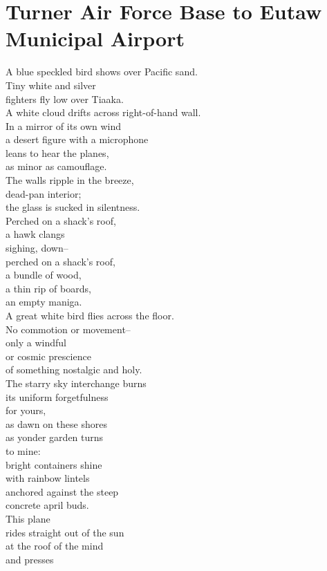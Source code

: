 \documentclass[smalldemyvopaper,11pt,twoside,onecolumn,openright,extrafontsizes]{memoir}
\begin{document}
\chapter{Turner Air Force Base to Eutaw Municipal Airport}
A blue speckled bird shows over Pacific sand.
\\Tiny white and silver
\\fighters fly low over Tiaaka.
\\A white cloud drifts across right-of-hand wall.
\\In a mirror of its own wind
\\a desert figure with a microphone
\\leans to hear the planes,
\\as minor as camouflage.
\\The walls ripple in the breeze,
\\dead-pan interior;
\\the glass is sucked in silentness.
\\Perched on a shack's roof,
\\a hawk clangs
\\sighing, down--
\\perched on a shack's roof,
\\a bundle of wood,
\\a thin rip of boards,
\\an empty maniga.
\\A great white bird flies across the floor.
\\No commotion or movement--
\\only a windful
\\or cosmic prescience
\\of something nostalgic and holy.
\\The starry sky interchange burns
\\its uniform forgetfulness
\\for yours,
\\as dawn on these shores
\\as yonder garden turns
\\to mine:
\\bright containers shine
\\with rainbow lintels
\\anchored against the steep
\\concrete april buds.
\\This plane
\\rides straight out of the sun
\\at the roof of the mind
\\and presses
\end{document}

